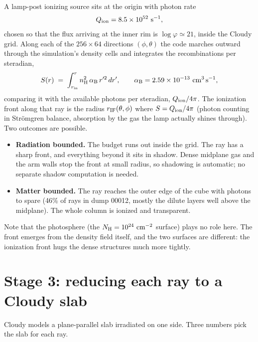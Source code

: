 \documentclass[11pt]{article}
\newcommand{\nH}{n_{\rm H}}
\newcommand{\rIF}{r_{\rm IF}}
\newcommand{\alphB}{\alpha_{\rm B}}
\begin{document}
A lamp-post ionizing source sits at the origin with photon rate
\begin{equation}
Q_{\rm ion} = 8.5\times10^{52}~{\rm s^{-1}},
\end{equation}
chosen so that the flux arriving at the inner rim is
$\log\varphi \simeq 21$, inside the Cloudy grid. Along each of the
$256\times64$ directions $(\phi,\theta)$ the code marches outward
through the simulation's density cells and integrates the
recombinations per steradian,
\begin{equation}
S(r) \;=\; \int_{r_{\rm in}}^{r} \nH^2\,\alphB\, r'^2\,dr',
\qquad \alphB = 2.59\times10^{-13}~{\rm cm^3\,s^{-1}},
\end{equation}
comparing it with the available photons per steradian,
$Q_{\rm ion}/4\pi$. The ionization front along that ray is the radius
$\rIF(\theta,\phi)$ where $S = Q_{\rm ion}/4\pi$ (photon counting in
Str\"omgren balance, absorption by the gas the lamp actually shines
through). Two outcomes are possible.
\begin{itemize}
\item \textbf{Radiation bounded.} The budget runs out inside the grid.
      The ray has a sharp front, and everything beyond it sits in
      shadow. Dense midplane gas and the arm walls stop the front at
      small radius, so shadowing is automatic; no separate shadow
      computation is needed.
\item \textbf{Matter bounded.} The ray reaches the outer edge of the
      cube with photons to spare (46\% of rays in dump 00012, mostly
      the dilute layers well above the midplane). The whole column is
      ionized and transparent.
\end{itemize}
Note that the photosphere (the $N_{\rm H} = 10^{24}~{\rm cm^{-2}}$
surface) plays no role here. The front emerges from the density field
itself, and the two surfaces are different: the ionization front hugs
the dense structures much more tightly.

\section{Stage 3: reducing each ray to a Cloudy slab}

Cloudy models a plane-parallel slab irradiated on one side. Three
numbers pick the slab for each ray.
\end{document}
